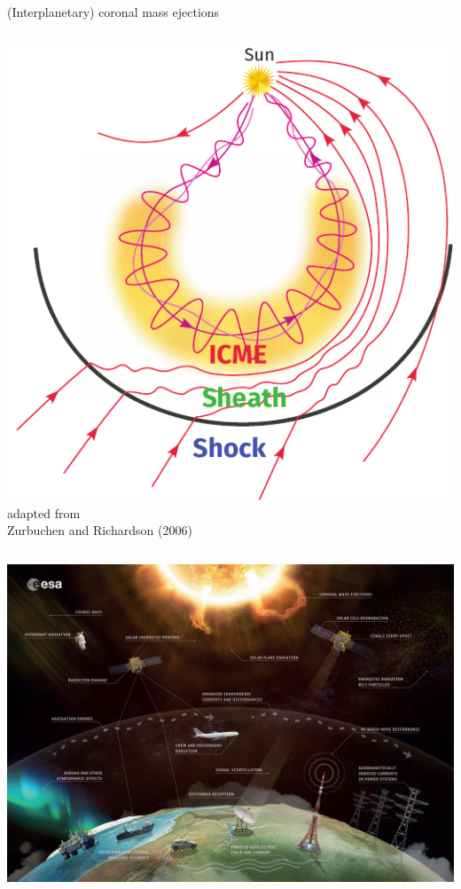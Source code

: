 \documentclass[10pt,aspectratio=169,usenames,dvipsnames]{beamer}
\begin{document}
\begin{frame}{(Interplanetary) coronal mass ejections}
\begin{columns}
\begin{column}{0.45\textwidth}
            \includegraphics[width=\textwidth]{images/ZurbuchenRichardson-adapted.pdf}\\
            \scriptsize adapted from\\Zurbuchen and Richardson (2006)
        \end{column}
    \end{columns}
\end{frame}

\begin{frame}[standout]          
    \includegraphics[height=\paperheight]{images/Space_weather_effects.jpg}
\end{frame}
\end{document}
